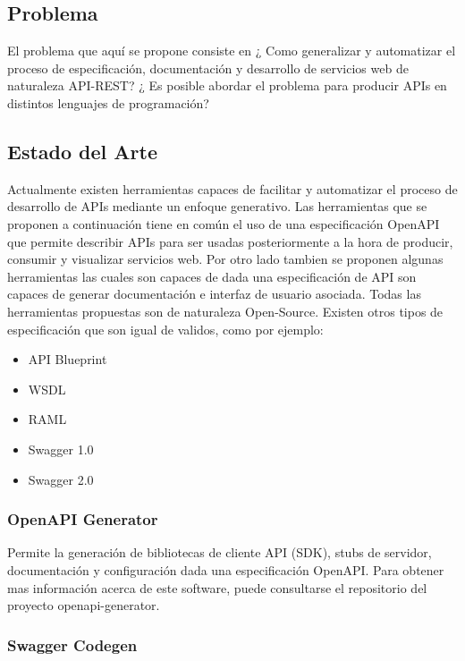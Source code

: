 \documentclass{svproc}
\begin{document}
\subsection{Problema}

El problema que aquí se propone consiste en ¿ Como generalizar y automatizar el proceso de especificación, documentación y desarrollo de servicios web de naturaleza API-REST?
¿ Es posible abordar el problema para producir APIs en distintos lenguajes de programación? 

\subsection{Estado del Arte}
Actualmente existen herramientas capaces de facilitar y automatizar el proceso de desarrollo de APIs mediante un enfoque generativo. Las  herramientas que se proponen a continuación tiene en común el uso de  una especificación OpenAPI\cite{spec} que permite describir APIs para ser usadas posteriormente a la hora de producir, consumir y visualizar servicios web. Por otro lado tambien se proponen algunas herramientas las cuales son capaces de dada una especificación de API son capaces de generar documentación e interfaz de usuario asociada. Todas las herramientas propuestas son de naturaleza Open-Source. Existen otros tipos de especificación que son igual de validos, como por ejemplo:


\begin{itemize}
\item API Blueprint
\item WSDL
\item RAML
\item Swagger 1.0
\item Swagger 2.0
\end{itemize}

\subsubsection{OpenAPI Generator}

Permite la generación de bibliotecas de cliente API (SDK), stubs de servidor, documentación y configuración dada una especificación OpenAPI. Para obtener mas información acerca de este software, puede consultarse el repositorio del proyecto openapi-generator.\cite{openapi}

\subsubsection{Swagger Codegen}
\end{document}
